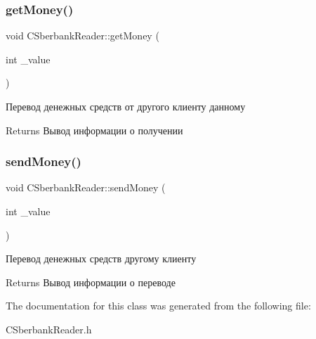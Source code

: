 \subsubsection{\texorpdfstring{get\+Money()}{getMoney()}}
{\footnotesize\ttfamily void C\+Sberbank\+Reader\+::get\+Money (\begin{DoxyParamCaption}\item[{int}]{\+\_\+value }\end{DoxyParamCaption})\hspace{0.3cm}{\ttfamily [inline]}}



Перевод денежных средств от другого клиенту данному 

\begin{DoxyReturn}{Returns}
Вывод информации о получении 
\end{DoxyReturn}
\mbox{\label{classCSberbankReader_a8956f7c08e0bbffc81f432d4fe3408f3}} 
\subsubsection{\texorpdfstring{send\+Money()}{sendMoney()}}
{\footnotesize\ttfamily void C\+Sberbank\+Reader\+::send\+Money (\begin{DoxyParamCaption}\item[{int}]{\+\_\+value }\end{DoxyParamCaption})\hspace{0.3cm}{\ttfamily [inline]}}



Перевод денежных средств другому клиенту 

\begin{DoxyReturn}{Returns}
Вывод информации о переводе 
\end{DoxyReturn}


The documentation for this class was generated from the following file\+:\begin{DoxyCompactItemize}
\item 
C\+Sberbank\+Reader.\+h\end{DoxyCompactItemize}
